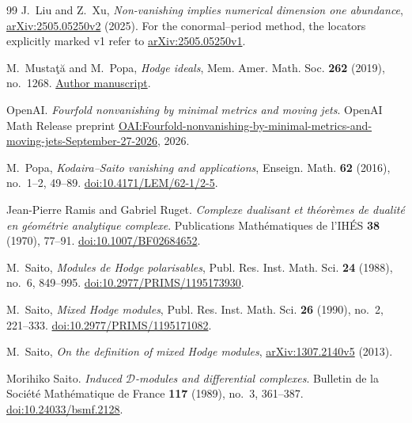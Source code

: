 \begin{thebibliography}{99}
J.~Liu and Z.~Xu,
\emph{Non-vanishing implies numerical dimension one abundance},
\href{https://arxiv.org/abs/2505.05250v2}{arXiv:2505.05250v2} (2025).
For the conormal--period method, the locators explicitly marked v1 refer to
\href{https://arxiv.org/abs/2505.05250v1}{arXiv:2505.05250v1}.

M.~Musta\c{t}\u{a} and M.~Popa,
\emph{Hodge ideals},
Mem. Amer. Math. Soc. \textbf{262} (2019), no.~1268.
\href{https://people.math.harvard.edu/~mpopa/papers/SI.pdf}{Author manuscript}.

OpenAI.
\newblock \emph{Fourfold nonvanishing by minimal metrics and moving jets}.
\newblock OpenAI Math Release preprint
\href{https://github.com/openai/math/blob/main/preprints/Fourfold-nonvanishing-by-minimal-metrics-and-moving-jets-September-27-2026/paper.pdf}{OAI:Fourfold-nonvanishing-by-minimal-metrics-and-moving-jets-September-27-2026},
2026.

M.~Popa,
\emph{Kodaira--Saito vanishing and applications},
Enseign. Math. \textbf{62} (2016), no.~1--2, 49--89.
\href{https://doi.org/10.4171/LEM/62-1/2-5}{doi:10.4171/LEM/62-1/2-5}.

Jean-Pierre Ramis and Gabriel Ruget.
\newblock \emph{Complexe dualisant et th{\'e}or{\`e}mes de dualit{\'e} en g{\'e}om{\'e}trie analytique complexe}.
\newblock Publications Math{\'e}matiques de l'IH{\'E}S \textbf{38} (1970), 77--91.
\newblock \href{https://doi.org/10.1007/BF02684652}{doi:10.1007/BF02684652}.

M.~Saito,
\emph{Modules de Hodge polarisables},
Publ. Res. Inst. Math. Sci. \textbf{24} (1988), no.~6, 849--995.
\href{https://doi.org/10.2977/PRIMS/1195173930}{doi:10.2977/PRIMS/1195173930}.

M.~Saito,
\emph{Mixed Hodge modules},
Publ. Res. Inst. Math. Sci. \textbf{26} (1990), no.~2, 221--333.
\href{https://doi.org/10.2977/PRIMS/1195171082}{doi:10.2977/PRIMS/1195171082}.

M.~Saito,
\emph{On the definition of mixed Hodge modules},
\href{https://arxiv.org/abs/1307.2140v5}{arXiv:1307.2140v5} (2013).

Morihiko Saito.
\newblock \emph{Induced {$\mathcal D$}-modules and differential complexes}.
\newblock Bulletin de la Soci{\'e}t{\'e} Math{\'e}matique de France \textbf{117} (1989), no.~3, 361--387.
\newblock \href{https://doi.org/10.24033/bsmf.2128}{doi:10.24033/bsmf.2128}.


\end{thebibliography}
